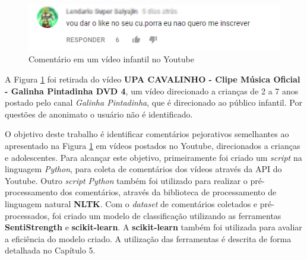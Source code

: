 \begin{figure}[H] %
	\caption{\label{fig:youtube_comment} Comentário em um vídeo infantil no Youtube}
	\begin{center}
	    \includegraphics[scale=1]{figuras/figura_1.png} %
	\end{center}
\end{figure}

A Figura \ref{fig:youtube_comment} foi retirada do vídeo \textbf{UPA CAVALINHO - Clipe Música Oficial - Galinha Pintadinha DVD 4}, um vídeo direcionado a crianças de 2 a 7 anos postado pelo canal \emph{Galinha Pintadinha}, que é direcionado ao público infantil. Por questões de anonimato o usuário não é identificado. %


O objetivo deste trabalho é identificar comentários pejorativos semelhantes ao apresentado na Figura \ref{fig:youtube_comment} em vídeos postados no Youtube, direcionados a crianças e adolescentes. Para alcançar este objetivo, primeiramente foi criado um \textit{script} na linguagem \textit{Python}, para coleta de comentários dos vídeos através da API do Youtube. Outro \textit{script} \textit{Python} também foi utilizado para realizar o pré-processamento dos comentários, através da biblioteca de processamento de linguagem natural \textbf{NLTK}. Com o \textit{dataset} de comentários coletados e pré-processados, foi criado um modelo de classificação utilizando as ferramentas \textbf{SentiStrength} e \textbf{scikit-learn}. A \textbf{scikit-learn} também foi utilizada para avaliar a eficiência do modelo criado. A utilização das ferramentas é descrita de forma detalhada no Capítulo 5. 

